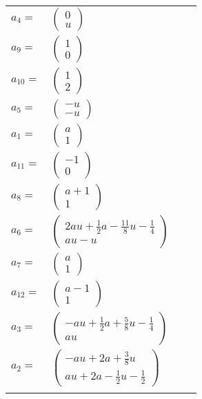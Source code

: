 \documentclass[1p]{elsarticle_modified}
\theoremstyle{definition}
\begin{document}
\begin{tabular}{m{7pt} m{180pt} m{7pt} m{180pt} }
\flushright $a_{4}=$&$\begin{pmatrix}0\\u\end{pmatrix}$ \\
\flushright $a_{9}=$&$\begin{pmatrix}1\\0\end{pmatrix}$ \\
\flushright $a_{10}=$&$\begin{pmatrix}1\\2\end{pmatrix}$ \\
\flushright $a_{5}=$&$\begin{pmatrix}- u\\- u\end{pmatrix}$ \\
\flushright $a_{1}=$&$\begin{pmatrix}a\\1\end{pmatrix}$ \\
\flushright $a_{11}=$&$\begin{pmatrix}-1\\0\end{pmatrix}$ \\
\flushright $a_{8}=$&$\begin{pmatrix}a+1\\1\end{pmatrix}$ \\
\flushright $a_{6}=$&$\begin{pmatrix}2 a u+\frac{1}{2} a-\frac{11}{8} u-\frac{1}{4}\\a u- u\end{pmatrix}$ \\
\flushright $a_{7}=$&$\begin{pmatrix}a\\1\end{pmatrix}$ \\
\flushright $a_{12}=$&$\begin{pmatrix}a-1\\1\end{pmatrix}$ \\
\flushright $a_{3}=$&$\begin{pmatrix}- a u+\frac{1}{2} a+\frac{5}{8} u-\frac{1}{4}\\a u\end{pmatrix}$ \\
\flushright $a_{2}=$&$\begin{pmatrix}- a u+2 a+\frac{3}{8} u\\a u+2 a-\frac{1}{2} u-\frac{1}{2}\end{pmatrix}$\\&\end{tabular}
\end{document}
